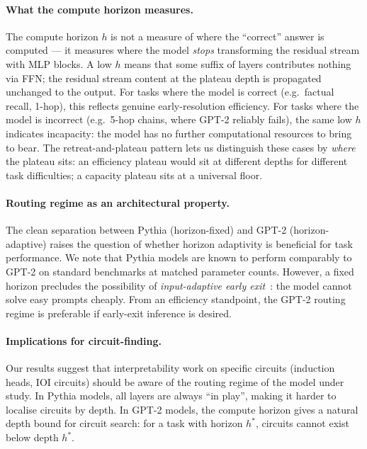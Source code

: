 \documentclass{article}
\begin{document}
\paragraph{What the compute horizon measures.}
The compute horizon $h$ is not a measure of where the ``correct''
answer is computed — it measures where the model \emph{stops}
transforming the residual stream with MLP blocks.
A low $h$ means that some suffix of layers contributes nothing via
FFN; the residual stream content at the plateau depth is propagated
unchanged to the output.
For tasks where the model is correct (e.g.\ factual recall, 1-hop),
this reflects genuine early-resolution efficiency.
For tasks where the model is incorrect (e.g.\ 5-hop chains, where
GPT-2 reliably fails), the same low $h$ indicates incapacity: the
model has no further computational resources to bring to bear.
The retreat-and-plateau pattern lets us distinguish these cases by
\emph{where} the plateau sits: an efficiency plateau would sit at
different depths for different task difficulties; a capacity plateau
sits at a universal floor.

\paragraph{Routing regime as an architectural property.}
The clean separation between Pythia (horizon-fixed) and GPT-2
(horizon-adaptive) raises the question of whether horizon adaptivity
is beneficial for task performance.
We note that Pythia models are known to perform comparably to GPT-2 on
standard benchmarks at matched parameter counts.
However, a fixed horizon precludes the possibility of
\emph{input-adaptive early exit}~\citep{schuster2022confident}: the
model cannot solve easy prompts cheaply.
From an efficiency standpoint, the GPT-2 routing regime is preferable
if early-exit inference is desired.

\paragraph{Implications for circuit-finding.}
Our results suggest that interpretability work on specific circuits
(induction heads, IOI circuits) should be aware of the routing regime
of the model under study.
In Pythia models, all layers are always ``in play'', making it harder
to localise circuits by depth.
In GPT-2 models, the compute horizon gives a natural depth bound for
circuit search: for a task with horizon $h^*$, circuits cannot exist
below depth $h^*$.
\end{document}
